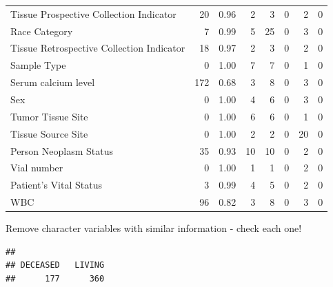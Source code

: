 \documentclass[]{article}
\newenvironment{Shaded}{\begin{snugshade}}{\end{snugshade}}
\newcommand{\KeywordTok}[1]{\textcolor[rgb]{0.13,0.29,0.53}{\textbf{#1}}}
\newcommand{\DataTypeTok}[1]{\textcolor[rgb]{0.13,0.29,0.53}{#1}}
\newcommand{\StringTok}[1]{\textcolor[rgb]{0.31,0.60,0.02}{#1}}
\newcommand{\OtherTok}[1]{\textcolor[rgb]{0.56,0.35,0.01}{#1}}
\newcommand{\OperatorTok}[1]{\textcolor[rgb]{0.81,0.36,0.00}{\textbf{#1}}}
\newcommand{\NormalTok}[1]{#1}
\begin{document}
\begin{longtable}[]{@{}lrrrrrrr@{}}
Tissue Prospective Collection Indicator & 20 & 0.96 & 2 & 3 & 0 & 2 &
0\tabularnewline
Race Category & 7 & 0.99 & 5 & 25 & 0 & 3 & 0\tabularnewline
Tissue Retrospective Collection Indicator & 18 & 0.97 & 2 & 3 & 0 & 2 &
0\tabularnewline
Sample Type & 0 & 1.00 & 7 & 7 & 0 & 1 & 0\tabularnewline
Serum calcium level & 172 & 0.68 & 3 & 8 & 0 & 3 & 0\tabularnewline
Sex & 0 & 1.00 & 4 & 6 & 0 & 3 & 0\tabularnewline
Tumor Tissue Site & 0 & 1.00 & 6 & 6 & 0 & 1 & 0\tabularnewline
Tissue Source Site & 0 & 1.00 & 2 & 2 & 0 & 20 & 0\tabularnewline
Person Neoplasm Status & 35 & 0.93 & 10 & 10 & 0 & 2 & 0\tabularnewline
Vial number & 0 & 1.00 & 1 & 1 & 0 & 2 & 0\tabularnewline
Patient's Vital Status & 3 & 0.99 & 4 & 5 & 0 & 2 & 0\tabularnewline
WBC & 96 & 0.82 & 3 & 8 & 0 & 3 & 0\tabularnewline
\bottomrule
\end{longtable}

\begin{Shaded}
\end{Shaded}

Remove character variables with similar information - check each one!

\begin{Shaded}
\end{Shaded}

\begin{verbatim}
## 
## DECEASED   LIVING 
##      177      360
\end{verbatim}
\end{document}
